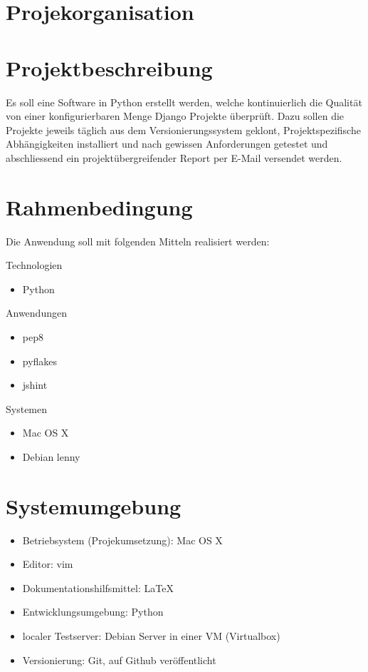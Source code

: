 \section{Projekorganisation}

\begin{figure}[!ht]
\begin{center}
\end{center}
\end{figure}

\section{Projektbeschreibung}
Es soll eine Software in Python erstellt werden, welche kontinuierlich die Qualität von einer konfigurierbaren Menge Django Projekte überprüft. Dazu sollen die Projekte jeweils täglich aus dem Versionierungssystem geklont, Projektspezifische Abhängigkeiten installiert und nach gewissen Anforderungen getestet und abschliessend ein projektübergreifender Report per E-Mail versendet werden.

\section{Rahmenbedingung}
Die Anwendung soll mit folgenden Mitteln realisiert werden:

Technologien
\begin{itemize}
    \item Python 

\end{itemize}

Anwendungen
\begin{itemize}
    \item pep8
    \item pyflakes
    \item jshint
\end{itemize}

Systemen
\begin{itemize}
    \item Mac OS X
    \item Debian lenny
\end{itemize}
    
\section{Systemumgebung}
\begin{itemize}
    \item Betriebsystem (Projekumsetzung): Mac OS X
    \item Editor: vim
    \item Dokumentationshilfsmittel: LaTeX
    \item Entwicklungsumgebung: Python
    \item localer Testserver: Debian Server in einer VM (Virtualbox) 
    \item Versionierung: Git, auf Github veröffentlicht
\end{itemize}
\clearpage

